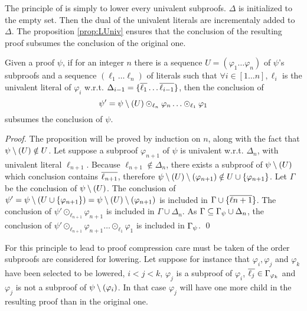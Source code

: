 \documentclass{llncs}
\begin{document}
The principle of {\LowerUnivalents} is simply to lower every univalent subproofs. $\Delta$ is
initialized to the empty set. Then the dual of the univalent literals are incrementaly added to
$\Delta$. The proposition \ref{prop:LUniv} ensures that the conclusion of the resulting proof
subsumes the conclusion of the original one.

\begin{proposition} \label{prop:LUniv}
Given a proof $\psi$, if for an integer $n$ there is a sequence $U = (\varphi_1 \ldots \varphi_n)$
of $\psi$'s subproofs and a sequence $(\ell_1 \ldots \ell_n)$ of literals such that $\forall i \in
[1 \ldots n], \ell_i$ is the univalent literal of $\varphi_i$ w.r.t. $\Delta_{i-1} = \{\overline{\ell_1}
\ldots \overline{\ell_{i-1}}\}$, then the conclusion of
$$ \psi' = \psi \setminus (U) \odot_{\ell_n} \varphi_n \ldots \odot_{\ell_1} \varphi_1 $$
subsumes the conclusion of $\psi$.
\end{proposition}

\begin{proof}
The proposition will be proved by induction on $n$, along with the fact that $\psi \setminus (U) \notin
U$. Let suppose a subproof $\varphi_{n+1}$ of $\psi$ is univalent w.r.t. $\Delta_n$, with univalent
literal $\ell_{n+1}$.  Because $\ell_{n+1} \notin \Delta_n$, there exists a subproof of
$\psi \setminus (U)$ which conclusion contains $\overline{\ell_{n+1}}$, therefore
$\psi \setminus (U) \setminus (\varphi_{n+1}) \notin U \cup \{\varphi_{n+1}\}$.  Let $\Gamma$ be the conclusion
of $\psi \setminus (U)$. The conclusion of $ \psi' = \psi \setminus (U \cup \{\varphi_{n+1}\}) =
\psi \setminus (U) \setminus (\varphi_{n+1}) $ is included in $\Gamma \cup \{\overline{\ell{n+1}}\}$. The conclusion
of $\psi' \odot_{\ell_{n+1}} \varphi_{n+1}$ is included in $\Gamma \cup \Delta_n$. As $\Gamma
\subseteq \Gamma_{\psi} \cup \Delta_n$, the conclusion of $\psi' \odot_{\ell_{n+1}}
\varphi_{n+1} \ldots \odot_{\ell_1} \varphi_1$ is included in $\Gamma_{\psi}$. \qed
\end{proof}

For this principle to lead to proof compression care must be taken of the order subproofs are
considered for lowering. Let suppose for instance that $\varphi_i, \varphi_j$ and $\varphi_k$ have
been selected to be lowered, $i < j < k$, $\varphi_j$ is a subproof of $\varphi_i$, $\overline{\ell_j}
\in \Gamma_{\varphi_k}$ and $\varphi_j$ is not a subproof of $\psi \setminus (\varphi_i)$. In that
case $\varphi_j$ will have one more child in the resulting proof than in the original one.
\end{document}
